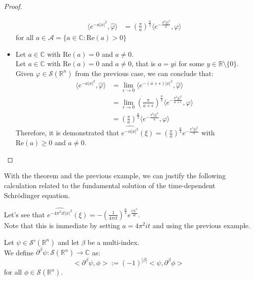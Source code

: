 \begin{proof}{}
\begin{itemize}
      \begin{align*}
      \langle e^{-a|x|^2}, \hat{\varphi} \rangle&=\left(\frac{\pi}{a}\right)^{\frac{n}{2}}\langle e^{-\frac{\pi^2|\xi|^2}{a}}, \varphi \rangle
      \end{align*}
      for all $a\in\mathcal{A}=\{a\in\mathbb{C}:\text{Re}(a)>0\}$
    \item Let $a\in\mathbb{C}$ with $\text{Re}(a)=0$ and $a\neq 0$.\\
      Let $a\in\mathbb{C}$ with $\text{Re}(a)=0$ and $a\neq 0$, that is $a=yi$ for some $y\in\mathbb{R}\setminus\{0\}$.\\
      Given $\varphi\in\mathcal{S}(\mathbb{R}^n)$ from the previous case, we can conclude that:
      \begin{align*}
        \langle e^{-a|x|^2},\hat{\varphi} \rangle &= \lim_{\epsilon\rightarrow 0}\langle e^{-(a+\epsilon)|x|^2},\hat{\varphi} \rangle\\
        &=\lim_{\epsilon\rightarrow 0}\left(\frac{\pi}{a+\epsilon}\right)^{\frac{n}{2}}\langle e^{-\frac{\pi^2|\xi|^2}{a+\epsilon}}, \varphi \rangle\\
        &=\left(\frac{\pi}{a}\right)^{\frac{n}{2}}\langle e^{-\frac{\pi^2|\xi|^2}{a}}, \varphi \rangle
      \end{align*}
      Therefore, it is demonstrated that $\hat{e^{-a|x|^2}}(\xi)=\left(\frac{\pi}{a}\right)^{\frac{n}{2}}e^{-\frac{\pi^2|\xi|^2}{a}}$ with $\text{Re}(a)\geq 0$ and $a\neq 0$.
  \end{itemize}
\end{proof}
\begin{note}{}
  With the theorem and the previous example, we can justify the following calculation related to the fundamental solution of the time-dependent Schrödinger equation.
\end{note}
\begin{example}{}
  Let’s see that $\hat{e^{-4\pi^2it|x|^2}}(\xi)=-\left(\frac{1}{4\pi it}\right)^{\frac{n}{2}}e^{\frac{i|\xi|^2}{4t}}$.\\
  Note that this is immediate by setting $a=4\pi^2it$ and using the previous example.
\end{example}
\begin{definition}{}
  Let $\psi\in\mathcal{S}'(\mathbb{R}^n)$ and let $\beta$ be a multi-index.\\
  We define $\partial^{\beta}\psi:\mathcal{S}(\mathbb{R}^n)\rightarrow \mathbb{C}$ as:
  $$<\partial^{\beta}\psi,\phi>:=(-1)^{|\beta|}<\psi,\partial^{\beta}\phi>$$
  for all $\phi\in\mathcal{S}(\mathbb{R}^n)$.
\end{definition}
